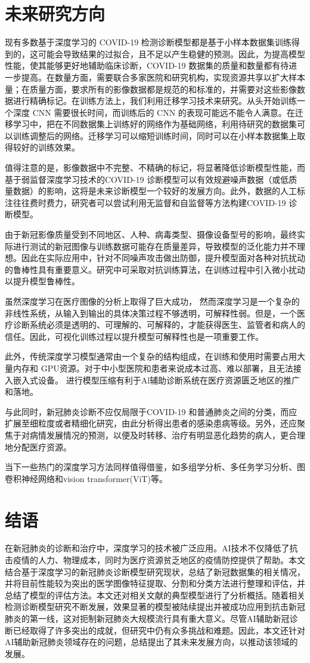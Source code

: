 \documentclass[journal,twoside,web]{ieeecolor}
\begin{document}
\section{未来研究方向}
现有多数基于深度学习的 COVID-19 检测诊断模型都是基于小样本数据集训练得到的，这可能会导致结果的过拟合，且不足以产生稳健的预测。因此，为提高模型性能，使其能够更好地辅助临床诊断，COVID-19 数据集的质量和数量都有待进一步提高。在数量方面，需要联合多家医院和研究机构，实现资源共享以扩大样本量；在质量方面，要求所有的影像数据都是规范的和标准的，并需要对这些影像数据进行精确标记。在训练方法上，我们利用迁移学习技术来研究。从头开始训练一个深度 CNN 需要很长时间，而训练后的 CNN 的表现可能远不能令人满意。在迁移学习中，把在不同数据集上训练好的网络作为基础网络，利用待研究的数据集可以训练调整后的网络。迁移学习可以缩短训练时间，同时可以在小样本数据集上取得较好的训练效果。

值得注意的是，影像数据中不完整、不精确的标记，将显著降低诊断模型性能，而基于弱监督深度学习技术的COVID-19 诊断模型可以有效规避噪声数据（或低质量数据）的影响，这将是未来诊断模型一个较好的发展方向。此外，数据的人工标注往往费时费力，研究者可以尝试利用无监督和自监督等方法构建COVID-19 诊断模型。

由于新冠影像质量受到不同地区、人种、病毒类型、摄像设备型号的影响，最终实际进行测试的新冠图像与训练数据可能存在质量差异，导致模型的泛化能力并不理想。因此在实际应用中，针对不同噪声攻击做出防御，提升模型面对各种对抗扰动的鲁棒性具有重要意义。研究中可采取对抗训练算法，在训练过程中引入微小扰动以提升模型鲁棒性。

虽然深度学习在医疗图像的分析上取得了巨大成功， 然而深度学习是一个复杂的非线性系统，从输入到输出的具体决策过程不够透明，可解释性弱。但是，一个医疗诊断系统必须是透明的、可理解的、可解释的，才能获得医生、监管者和病人的信任。因此，可视化训练过程以提升模型可解释性也是一项重要工作。

此外，传统深度学习模型通常由一个复杂的结构组成，在训练和使用时需要占用大量内存和 GPU资源。对于中小型医院和患者来说成本过高、难以部署，且无法接入嵌入式设备。
进行模型压缩有利于Al辅助诊断系统在医疗资源匮乏地区的推广和落地。

与此同时，新冠肺炎诊断不应仅局限于COVID-19 和普通肺炎之间的分类，而应扩展至细粒度或者精细化研究，由此分析得出患者的感染患病等级。另外，还应聚焦于对病情发展情况的预测，以便及时转移、治疗有明显恶化趋势的病人，更合理地分配医疗资源。

当下一些热门的深度学习方法同样值得借鉴，如多组学分析、多任务学习分析、图卷积神经网络和vision transformer(ViT)等。
\section{结语}
在新冠肺炎的诊断和治疗中，深度学习的技术被广泛应用。AI技术不仅降低了抗击疫情的人力、物理成本，同时为医疗资源贫乏地区的疫情防控提供了帮助。本文结合基于深度学习的新冠肺炎诊断模型研究现状，总结了新冠数据集的相关情况，并将目前性能较为突出的医学图像特征提取、分割和分类方法进行整理和评估，并总结了模型的评估方法。本文还对相关文献的典型模型进行了分析概括。随着相关检测诊断模型研究不断发展，效果显著的模型被陆续提出并被成功应用到抗击新冠肺炎的第一线，这对扼制新冠肺炎大规模流行具有重大意义。尽管AI辅助新冠诊断已经取得了许多突出的成就，但研究中仍有众多挑战和难题。因此，本文还针对AI辅助新冠肺炎领域存在的问题，总结提出了其未来发展方向，以推动该领域的发展。
\end{document}
